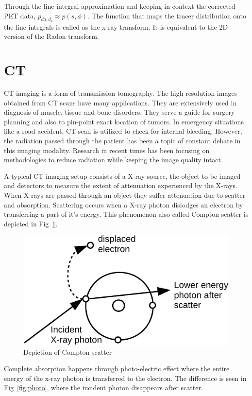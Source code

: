 Through the line integral approximation and keeping in context the corrected \ac{PET} data, $p_{d{a},d_{b}}\approx p(s,\phi)$. The function that maps the tracer distribution onto the line integrals is called as the x-ray transform. It is equivalent to the 2D version of the Radon transform. 

\section{CT}

\ac{CT} imaging is a form of transmission tomography. The high resolution images obtained from \ac{CT} scans have many applications. They are extensively used in diagnosis of muscle, tissue and bone disorders. They serve a guide for surgery planning and also to pin-point exact location of tumors. In emergency situations like a road accident, \ac{CT} scan is utilized to check for internal bleeding. However, the radiation passed through the patient has been a topic of constant debate in this imaging modality. Research in recent times has been focusing on methodologies to reduce radiation while keeping the image quality intact. 


A typical \ac{CT} imaging setup consists of a X-ray source, the object to be imaged and detectors to measure the extent of attenuation experienced by the X-rays. When X-rays are passed through an object they suffer attenuation due to scatter and absorption. Scattering occurs when a X-ray photon dislodges an electron by transferring a part of it's energy. This phenomenon also called Compton scatter is depicted in Fig~\ref{fig:com}. 
\begin{figure}[!htbp]
	\centering
	\includegraphics[width=0.7\linewidth]{./Figures/compton-crop.pdf}
	\caption{Depiction of Compton scatter}
	\label{fig:com}
\end{figure}

Complete absorption happens through photo-electric effect where the entire energy of the x-ray photon is transferred to the electron. The difference is seen in Fig~\ref{fig:photo}, where the incident photon disappears after scatter. 

